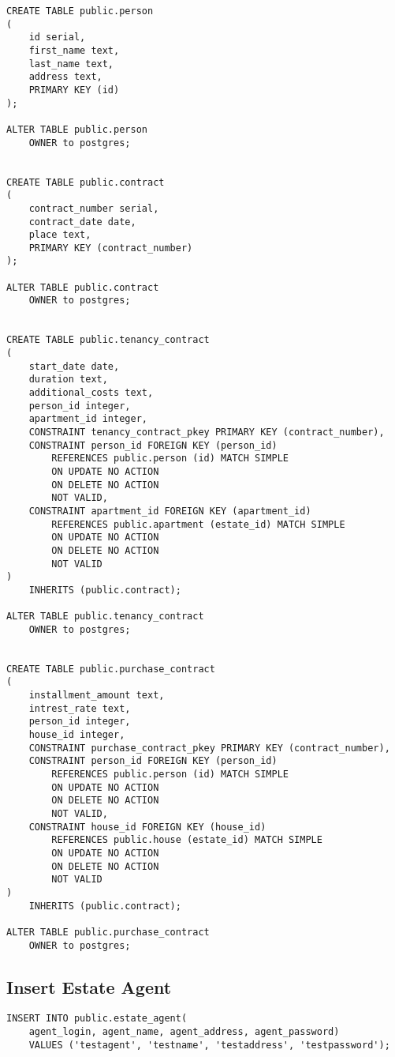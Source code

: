 \documentclass[ngerman]{dis-template-add}
\begin{document}
\begin{verbatim}
CREATE TABLE public.person
(
    id serial,
    first_name text,
    last_name text,
    address text,
    PRIMARY KEY (id)
);

ALTER TABLE public.person
    OWNER to postgres;


CREATE TABLE public.contract
(
    contract_number serial,
    contract_date date,
    place text,
    PRIMARY KEY (contract_number)
);

ALTER TABLE public.contract
    OWNER to postgres;


CREATE TABLE public.tenancy_contract
(
    start_date date,
    duration text,
    additional_costs text,
    person_id integer,
    apartment_id integer,
    CONSTRAINT tenancy_contract_pkey PRIMARY KEY (contract_number),
    CONSTRAINT person_id FOREIGN KEY (person_id)
        REFERENCES public.person (id) MATCH SIMPLE
        ON UPDATE NO ACTION
        ON DELETE NO ACTION
        NOT VALID,
    CONSTRAINT apartment_id FOREIGN KEY (apartment_id)
        REFERENCES public.apartment (estate_id) MATCH SIMPLE
        ON UPDATE NO ACTION
        ON DELETE NO ACTION
        NOT VALID
)
    INHERITS (public.contract);

ALTER TABLE public.tenancy_contract
    OWNER to postgres;


CREATE TABLE public.purchase_contract
(
    installment_amount text,
    intrest_rate text,
    person_id integer,
    house_id integer,
    CONSTRAINT purchase_contract_pkey PRIMARY KEY (contract_number),
    CONSTRAINT person_id FOREIGN KEY (person_id)
        REFERENCES public.person (id) MATCH SIMPLE
        ON UPDATE NO ACTION
        ON DELETE NO ACTION
        NOT VALID,
    CONSTRAINT house_id FOREIGN KEY (house_id)
        REFERENCES public.house (estate_id) MATCH SIMPLE
        ON UPDATE NO ACTION
        ON DELETE NO ACTION
        NOT VALID
)
    INHERITS (public.contract);

ALTER TABLE public.purchase_contract
    OWNER to postgres;
\end{verbatim}


\subsection*{Insert Estate Agent}

\begin{verbatim}
INSERT INTO public.estate_agent(
    agent_login, agent_name, agent_address, agent_password)
    VALUES ('testagent', 'testname', 'testaddress', 'testpassword');
\end{verbatim}
\end{document}
